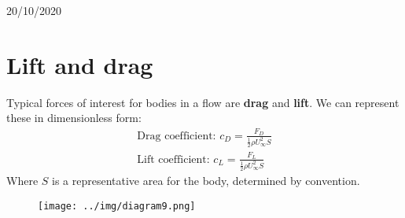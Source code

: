 \documentclass[class=report, crop=false, 12pt,a4paper]{standalone}
\begin{document}
\begin{center}
  20/10/2020
\end{center}
\section{Lift and drag}
Typical forces of interest for bodies in a flow are \textbf{drag} and \textbf{lift}. We can represent these in dimensionless form:
\begin{gather}
  \textrm{Drag coefficient: }c_D = \frac{F_D}{\frac{1}{2} \rho U_\infty^2S}\\
  \textrm{Lift coefficient: }c_L = \frac{F_L}{\frac{1}{2}\rho U_\infty^2S}
\end{gather}
Where $S$ is a representative area for the body, determined by convention.
\begin{figure}[H]
  \centering
  \texttt{[image: ../img/diagram9.png]}
\end{figure}
\end{document}
